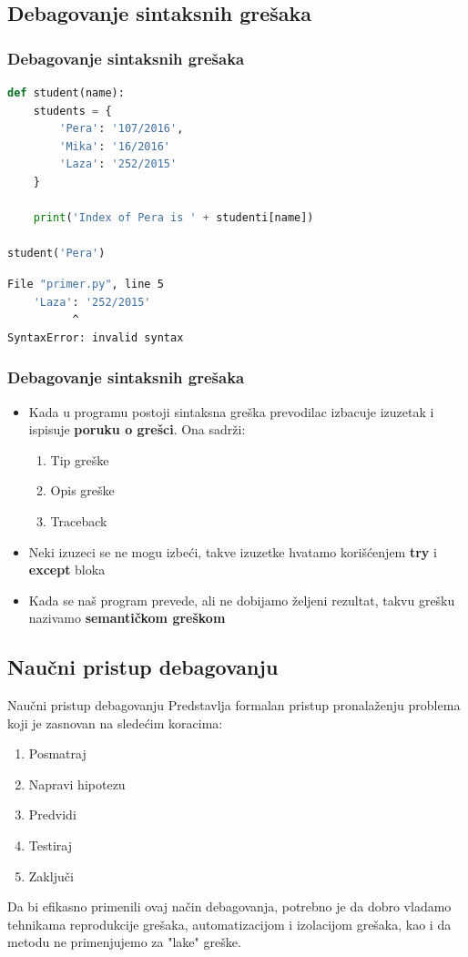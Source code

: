 \documentclass{beamer}
\begin{document}
\subsection{Debagovanje sintaksnih grešaka}
\begin{frame}[fragile]
\frametitle{Debagovanje sintaksnih grešaka}
\begin{exampleblock}{}
\begin{lstlisting}[language = python]
def student(name):
    students = {
        'Pera': '107/2016',
        'Mika': '16/2016'
        'Laza': '252/2015'
    }

    print('Index of Pera is ' + studenti[name])

student('Pera')
\end{lstlisting}
\end{exampleblock}
\begin{exampleblock}{}
\begin{lstlisting}[language = bash]
  File "primer.py", line 5
    'Laza': '252/2015'
          ^
SyntaxError: invalid syntax
\end{lstlisting}
\end{exampleblock}
\end{frame}
\begin{frame}
\frametitle{Debagovanje sintaksnih grešaka}
\begin{itemize}
\item Kada u programu postoji sintaksna greška prevodilac izbacuje izuzetak i ispisuje \textbf{poruku o grešci}. Ona sadrži:
\begin{enumerate}
    \item Tip greške
    \item Opis greške
    \item Traceback
\end{enumerate}
\item Neki izuzeci se ne mogu izbeći, takve izuzetke hvatamo korišćenjem \textbf{try} i \textbf{except} bloka
\item Kada se naš program prevede, ali ne dobijamo željeni rezultat, takvu grešku nazivamo \textbf{semantičkom greškom}
\end{itemize}
\end{frame}
\subsection{Naučni pristup debagovanju}
\begin{frame}{Naučni pristup debagovanju}
Predstavlja formalan pristup pronalaženju problema koji je zasnovan na sledećim koracima:
\begin{enumerate}
    \item Posmatraj
    \item Napravi hipotezu
    \item Predvidi
    \item Testiraj
    \item Zaključi
\end{enumerate}
Da bi efikasno primenili ovaj način debagovanja, potrebno je da dobro vladamo tehnikama reprodukcije grešaka, automatizacijom i izolacijom grešaka, kao i da metodu ne primenjujemo za "lake" greške.
\end{frame}
\end{document}
